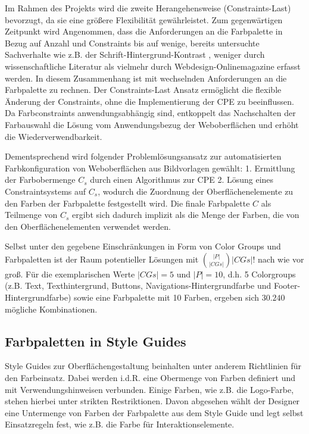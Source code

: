 \documentclass[10pt,a4paper,bibliography=totoc,twocolumn]{scrartcl}
\begin{document}
Im Rahmen des Projekts wird die zweite Herangehensweise (Constraints-Last) bevorzugt, da sie eine größere Flexibilität gewährleistet. Zum gegenwärtigen Zeitpunkt wird Angenommen, dass die Anforderungen an die Farbpalette in Bezug auf Anzahl und Constraints bis auf wenige, bereits untersuchte Sachverhalte wie z.B. der Schrift-Hintergrund-Kontrast \citep{readability}, weniger durch wissenschaftliche Literatur als vielmehr durch Webdesign-Onlinemagazine erfasst werden. In diesem Zusammenhang ist mit wechselnden Anforderungen an die Farbpalette zu rechnen. Der Constraints-Last Ansatz ermöglicht die flexible Änderung der Constraints, ohne die Implementierung der CPE zu beeinflussen. Da Farbconstraints anwendungsabhängig sind, entkoppelt das Nachschalten der Farbauswahl die Lösung vom Anwendungsbezug der Weboberflächen und erhöht die Wiederverwendbarkeit.

Dementsprechend wird folgender Problemlösungsansatz zur automatisierten Farbkonfiguration von Weboberflächen aus Bildvorlagen gewählt: 1. Ermittlung der Farbobermenge $C_s$ durch einen Algorithmus zur CPE 2. Lösung eines Constraintsystems auf $C_s$, wodurch die Zuordnung der Oberflächenelemente zu den Farben der Farbpalette festgestellt wird. Die finale Farbpalette $C$ als Teilmenge von $C_s$ ergibt sich dadurch implizit als die Menge der Farben, die von den Oberflächenelementen verwendet werden.

Selbst unter den gegebene Einschränkungen in Form von Color Groups und Farbpaletten ist der Raum potentieller Lösungen mit $\binom{|P|}{|CGs|} |CGs|!$ nach  wie vor groß. Für die exemplarischen Werte $|CGs| = 5$ und $|P| = 10$, d.h. 5 Colorgroups (z.B. Text, Texthintergrund, Buttons, Navigations-Hintergrundfarbe und Footer-Hintergrundfarbe) sowie eine Farbpalette mit 10 Farben, ergeben sich $30.240$ mögliche Kombinationen.

\subsection{Farbpaletten in Style Guides}
\label{sec:swatches}

Style Guides zur Oberflächengestaltung beinhalten unter anderem Richtlinien für den Farbeinsatz. Dabei werden i.d.R. eine Obermenge von Farben definiert und mit Verwendungshinweisen verbunden. Einige Farben, wie z.B. die Logo-Farbe, stehen hierbei unter strikten Restriktionen. Davon abgesehen wählt der Designer eine Untermenge von Farben der Farbpalette aus dem Style Guide und legt selbst Einsatzregeln fest, wie z.B. die Farbe für Interaktionselemente.
\end{document}
